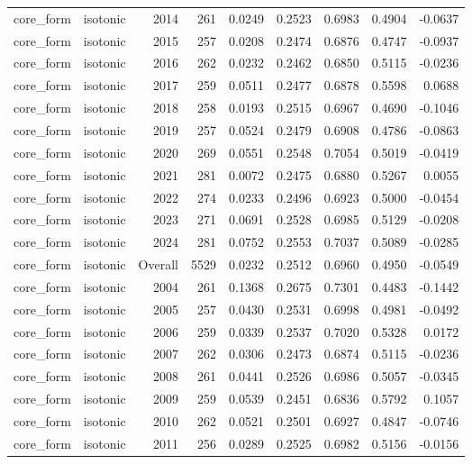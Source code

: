 \begin{table}[t]
\begin{tabular}{@{} l l r r r r r r r @{} }
      core\_form & isotonic & 2014 & 261 & 0.0249 & 0.2523 & 0.6983 & 0.4904 & -0.0637 \\
      core\_form & isotonic & 2015 & 257 & 0.0208 & 0.2474 & 0.6876 & 0.4747 & -0.0937 \\
      core\_form & isotonic & 2016 & 262 & 0.0232 & 0.2462 & 0.6850 & 0.5115 & -0.0236 \\
      core\_form & isotonic & 2017 & 259 & 0.0511 & 0.2477 & 0.6878 & 0.5598 & 0.0688 \\
      core\_form & isotonic & 2018 & 258 & 0.0193 & 0.2515 & 0.6967 & 0.4690 & -0.1046 \\
      core\_form & isotonic & 2019 & 257 & 0.0524 & 0.2479 & 0.6908 & 0.4786 & -0.0863 \\
      core\_form & isotonic & 2020 & 269 & 0.0551 & 0.2548 & 0.7054 & 0.5019 & -0.0419 \\
      core\_form & isotonic & 2021 & 281 & 0.0072 & 0.2475 & 0.6880 & 0.5267 & 0.0055 \\
      core\_form & isotonic & 2022 & 274 & 0.0233 & 0.2496 & 0.6923 & 0.5000 & -0.0454 \\
      core\_form & isotonic & 2023 & 271 & 0.0691 & 0.2528 & 0.6985 & 0.5129 & -0.0208 \\
      core\_form & isotonic & 2024 & 281 & 0.0752 & 0.2553 & 0.7037 & 0.5089 & -0.0285 \\
      core\_form & isotonic & Overall & 5529 & 0.0232 & 0.2512 & 0.6960 & 0.4950 & -0.0549 \\
      core\_form & isotonic & 2004 & 261 & 0.1368 & 0.2675 & 0.7301 & 0.4483 & -0.1442 \\
      core\_form & isotonic & 2005 & 257 & 0.0430 & 0.2531 & 0.6998 & 0.4981 & -0.0492 \\
      core\_form & isotonic & 2006 & 259 & 0.0339 & 0.2537 & 0.7020 & 0.5328 & 0.0172 \\
      core\_form & isotonic & 2007 & 262 & 0.0306 & 0.2473 & 0.6874 & 0.5115 & -0.0236 \\
      core\_form & isotonic & 2008 & 261 & 0.0441 & 0.2526 & 0.6986 & 0.5057 & -0.0345 \\
      core\_form & isotonic & 2009 & 259 & 0.0539 & 0.2451 & 0.6836 & 0.5792 & 0.1057 \\
      core\_form & isotonic & 2010 & 262 & 0.0521 & 0.2501 & 0.6927 & 0.4847 & -0.0746 \\
      core\_form & isotonic & 2011 & 256 & 0.0289 & 0.2525 & 0.6982 & 0.5156 & -0.0156 \\

\end{tabular}
\end{table}
